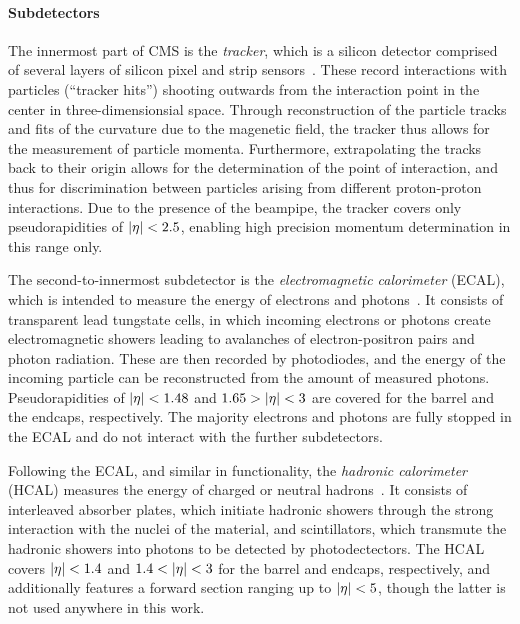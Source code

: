 \paragraph{Subdetectors}
The innermost part of CMS is the \textit{tracker}, which is a silicon detector comprised of several layers of silicon pixel and strip sensors~\cite{CMS:2014pgm,CMSTrackerGroup:2020edz}. These record interactions with particles (``tracker hits'') shooting outwards from the interaction point in the center in three-dimensionsial space. Through reconstruction of the particle tracks and fits of the curvature due to the magenetic field, the tracker thus allows for the measurement of particle momenta. Furthermore, extrapolating the tracks back to their origin allows for the determination of the point of interaction, and thus for discrimination between particles arising from different proton-proton interactions. Due to the presence of the beampipe, the tracker covers only pseudorapidities of $|\eta| < 2.5$, enabling high precision momentum determination in this range only.

The second-to-innermost subdetector is the \textit{electromagnetic calorimeter} (ECAL), which is intended to measure the energy of electrons and photons~\cite{CMS:1997ysd,CMS:EGM-17-001}. It consists of transparent lead tungstate cells, in which incoming electrons or photons create electromagnetic showers leading to avalanches of electron-positron pairs and photon radiation. These are then recorded by photodiodes, and the energy of the incoming particle can be reconstructed from the amount of measured photons. Pseudorapidities of $|\eta| < 1.48$ and $1.65 > |\eta| < 3$ are covered for the barrel and the endcaps, respectively. The majority electrons and photons are fully stopped in the ECAL and do not interact with the further subdetectors.

Following the ECAL, and similar in functionality, the \textit{hadronic calorimeter} (HCAL) measures the energy of charged or neutral hadrons~\cite{CMS:1997xji,CMS:2012tda}. It consists of interleaved absorber plates, which initiate hadronic showers through the strong interaction with the nuclei of the material, and scintillators, which transmute the hadronic showers into photons to be detected by photodectectors. The HCAL covers $|\eta| < 1.4$ and $1.4 < |\eta| < 3$ for the barrel and endcaps, respectively, and additionally features a forward section ranging up to $|\eta| < 5$, though the latter is not used anywhere in this work.

